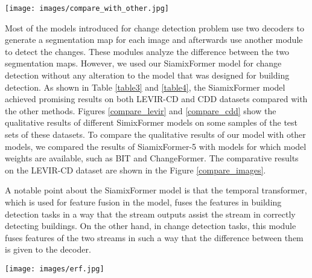 \documentclass{article}
\begin{document}
\begin{figure*}[b!]
	\begin{center}
		\texttt{[image: images/compare\_with\_other.jpg]}
		\caption{Compare result of SiamixFomer-5 with BIT and ChangeFormer on LEVIR-CD dataset.}
		\label{compare_images}
	\end{center}
\end{figure*}
Most of the models introduced for change detection problem use two decoders to generate a segmentation map for each image and afterwards use another module to detect the changes. These modules analyze the difference between the two segmentation maps. However, we used our SiamixFormer model for change detection without any alteration to the model that was designed for building detection. As shown in Table \ref{table3} and \ref{table4}, the SiamixFormer model achieved promising results on both LEVIR-CD and CDD datasets compared with the other methods. Figures \ref{compare_levir} and \ref{compare_cdd} show the qualitative results of different SimixFormer models on some samples of the test sets of these datasets. To compare the qualitative results of our model with other models, we compared the results of SiamixFormer-5 with models for which model weights are available, such as BIT and ChangeFormer. The comparative results on the LEVIR-CD dataset are shown in the Figure \ref{compare_images}.



A notable point about the SiamixFormer model is that the temporal transformer, which is used for feature fusion in the model, fuses the features in building detection tasks in a way that the  stream outputs assist the  stream in correctly detecting buildings. On the other hand, in change detection tasks, this module fuses features of the two streams in such a way that the difference between them is given to the decoder.

\begin{figure*}[t]
	\begin{center}
		\texttt{[image: images/erf.jpg]}
		\caption{Comparison effective receptive field of each stage's output between SiamixFormer-2 and ChangeFormer.}
		\label{erf}
	\end{center}
\end{figure*}
\end{document}
